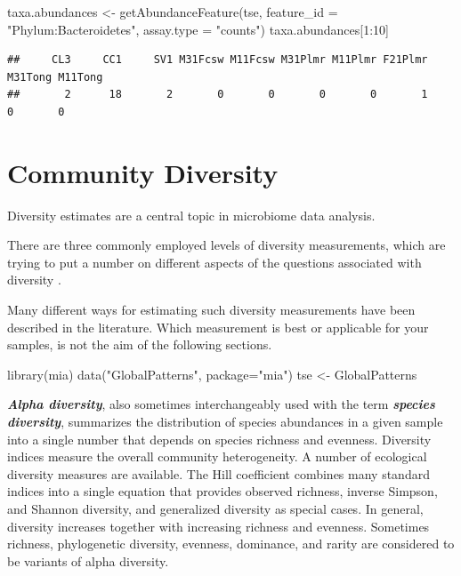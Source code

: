 \documentclass[
]{book}
\newenvironment{Shaded}{\begin{snugshade}}{\end{snugshade}}
\newcommand{\AttributeTok}[1]{\textcolor[rgb]{0.77,0.63,0.00}{#1}}
\newcommand{\DecValTok}[1]{\textcolor[rgb]{0.00,0.00,0.81}{#1}}
\newcommand{\FunctionTok}[1]{\textcolor[rgb]{0.00,0.00,0.00}{#1}}
\newcommand{\NormalTok}[1]{#1}
\newcommand{\OtherTok}[1]{\textcolor[rgb]{0.56,0.35,0.01}{#1}}
\newcommand{\SpecialCharTok}[1]{\textcolor[rgb]{0.00,0.00,0.00}{#1}}
\newcommand{\StringTok}[1]{\textcolor[rgb]{0.31,0.60,0.02}{#1}}
\begin{document}
\begin{Shaded}
\begin{Highlighting}[]
\NormalTok{taxa.abundances }\OtherTok{\textless{}{-}} \FunctionTok{getAbundanceFeature}\NormalTok{(tse, }
                                      \AttributeTok{feature\_id =} \StringTok{"Phylum:Bacteroidetes"}\NormalTok{,}
                                      \AttributeTok{assay.type =} \StringTok{"counts"}\NormalTok{)}
\NormalTok{taxa.abundances[}\DecValTok{1}\SpecialCharTok{:}\DecValTok{10}\NormalTok{]}
\end{Highlighting}
\end{Shaded}

\begin{verbatim}
##     CL3     CC1     SV1 M31Fcsw M11Fcsw M31Plmr M11Plmr F21Plmr M31Tong M11Tong 
##       2      18       2       0       0       0       0       1       0       0
\end{verbatim}

\hypertarget{community-diversity}{%
\chapter{Community Diversity}\label{community-diversity}}

Diversity estimates are a central topic in microbiome data analysis.

There are three commonly employed levels of diversity measurements,
which are trying to put a number on different aspects of the questions
associated with diversity \citep{Whittaker1960}.

Many different ways for estimating such diversity measurements have been
described in the literature. Which measurement is best or applicable for your
samples, is not the aim of the following sections.

\begin{Shaded}
\begin{Highlighting}[]
\FunctionTok{library}\NormalTok{(mia)}
\FunctionTok{data}\NormalTok{(}\StringTok{"GlobalPatterns"}\NormalTok{, }\AttributeTok{package=}\StringTok{"mia"}\NormalTok{)}
\NormalTok{tse }\OtherTok{\textless{}{-}}\NormalTok{ GlobalPatterns}
\end{Highlighting}
\end{Shaded}

\textbf{\emph{Alpha diversity}}, also sometimes interchangeably used with the
term \textbf{\emph{species diversity}}, summarizes the distribution of species
abundances in a given sample into a single number that depends on
species richness and evenness. Diversity indices measure the overall
community heterogeneity. A number of ecological diversity measures are
available. The Hill coefficient combines many standard indices into a
single equation that provides observed richness, inverse Simpson, and
Shannon diversity, and generalized diversity as special cases. In
general, diversity increases together with increasing richness and
evenness. Sometimes richness, phylogenetic diversity, evenness, dominance,
and rarity are considered to be variants of alpha diversity.
\end{document}
